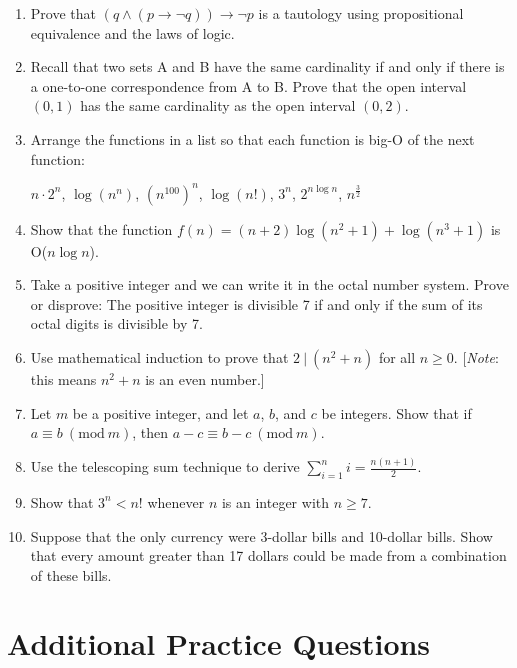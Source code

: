 \documentclass[11pt]{article}
\newcommand{\PMod}[1]{\ (\mathrm{mod}\ #1)}
\begin{document}
\begin{enumerate}
    \item Prove that $(q \land (p \to \neg q)) \to \neg p$ is a tautology using propositional equivalence and the laws of logic.
    \item Recall that two sets A and B have the same cardinality if and only if there is a one-to-one correspondence from A to B. Prove that the open interval $(0, 1)$ has the same cardinality as the open interval $(0, 2)$.
    \item Arrange the functions in a list so that each function is big-O of the next function:
    
    $n \cdot 2^n$, $\log(n^n)$, $(n^{100})^n$, $\log(n!)$, $3^n$, $2^{n \log n}$, $n^{\frac{3}{2}}$
    
    \item Show that the function $f(n) = (n + 2)\log(n^2 + 1) + \log(n^3 + 1)$ is O($n \log n$).
    \item Take a positive integer and we can write it in the octal number system. Prove or disprove: The positive integer is divisible 7 if and only if the sum of its octal digits is divisible by 7.
    \item Use mathematical induction to prove that $2\ |\ (n^2 + n)$ for all $n \geq 0$. [\textit{Note}: this means $n^2 + n$ is an even number.]
    \item Let $m$ be a positive integer, and let $a$, $b$, and $c$ be integers. Show that if $a \equiv b \PMod{m}$, then $a - c \equiv b - c \PMod{m}$.
    \item Use the telescoping sum technique to derive $\sum_{i=1}^{n} i = \frac{n(n + 1)}{2}$.
    \item Show that $3^n < n!$ whenever $n$ is an integer with $n \geq 7$.
    \item Suppose that the only currency were 3-dollar bills and 10-dollar bills. Show that every amount greater than 17 dollars could be made from a combination of these bills.
\end{enumerate}

\section{Additional Practice Questions}
\end{document}
